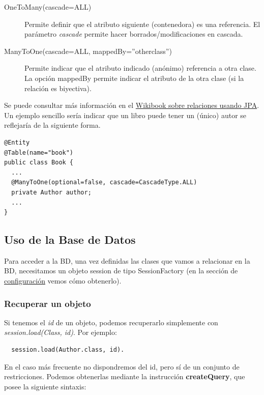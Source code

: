 \documentclass[11pt]{article}
\begin{document}
\begin{description}

\item[OneToMany(cascade=ALL)] Permite definir que el atributo siguiente (contenedora) es una referencia. El parámetro \emph{cascade} permite hacer borrados/modificaciones en cascada.

\item[ManyToOne(cascade=ALL, mappedBy=''otherclass'')] Permite indicar que el atributo indicado (anónimo)
referencia a otra clase. La opción mappedBy permite indicar el atributo de la otra clase (si la relación es biyectiva).

\end{description}


Se puede consultar más información en el
\href{https://en.wikibooks.org/wiki/Java_Persistence/Relationships}{Wikibook
sobre relaciones usando JPA}. Un ejemplo sencillo sería indicar que un libro
puede tener un (único) autor se reflejaría de la siguiente forma.

\begin{lstlisting}
@Entity
@Table(name="book")
public class Book {
  ...
  @ManyToOne(optional=false, cascade=CascadeType.ALL)
  private Author author;
  ...
}
\end{lstlisting}


\subsection{Uso de la Base de Datos} \label{sec-6-3}

Para acceder a la BD, una vez definidas las clases que vamos a
relacionar en la BD, necesitamos un objeto \textsf{session} de tipo
\textsf{SessionFactory} (en la sección de \hyperref[sec-6-4]{configuración} vemos cómo obtenerlo).


\subsubsection{Recuperar un objeto} \label{sec-6-3-1}

Si tenemos el \emph{id} de un objeto, podemos recuperarlo simplemente con
\emph{session.load(Class, id)}. Por ejemplo:

\begin{lstlisting}
  session.load(Author.class, id).
\end{lstlisting}

En el caso más frecuente no dispondremos del \textsf{id}, pero sí de un conjunto de
restricciones. Podemos obtenerlas mediante la instrucción \textbf{createQuery}, 
que posee la siguiente sintaxis:
\end{document}

